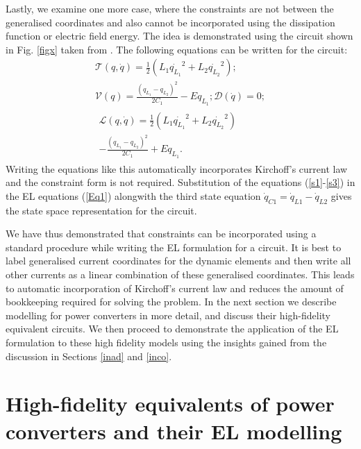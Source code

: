 \documentclass[preprint,12pt]{elsarticle}
\begin{document}
Lastly, we examine one more case, where the constraints are not between the generalised coordinates and also cannot be incorporated using the dissipation function or electric field energy.  
The idea is demonstrated using the circuit shown in Fig. \ref{figx} taken from \cite{scherpen_2003}. The following equations can be written for the circuit:
\begin{eqnarray}\label{s1}
\mathcal{T}(q,\dot{q}) = \frac{1}{2}(L_1\dot{q_{L_1}}^2+L_2\dot{q_{L_2}}^2);\\\label{s2} \mathcal{V}(q) = \frac{(q_{L_1}-q_{L_2})^2}{2C_1}-Eq_{L_1}; \mathcal{D}(\dot{q})=0; \\
\label{s3} \begin{split}
\mathcal{L}(q,\dot{q})=\frac{1}{2}(L_1\dot{q_{L_1}}^2+L_2\dot{q_{L_2}}^2)\\-\frac{(q_{L_1}-q_{L_2})^2}{2C_1}+Eq_{L_1}.
\end{split}
\end{eqnarray}
Writing the equations like this automatically incorporates Kirchoff's current law and the constraint form is not required. Substitution of the equations (\ref{s1}-\ref{s3}) in the EL equations (\ref{Eq1}) alongwith the third state equation $\dot{q}_{C1}=\dot{q}_{L1}-\dot{q}_{L2}$ gives the state space representation for the circuit.

We have thus demonstrated that constraints can be incorporated using a standard procedure while writing the EL formulation for a circuit. It is best to label generalised current coordinates for the dynamic elements and then write all other currents as a linear combination of these generalised coordinates. This leads to automatic incorporation of Kirchoff's current law and reduces the amount of bookkeeping required for solving the problem. In the next section we describe modelling for power converters in more detail, and discuss their high-fidelity equivalent circuits. We then proceed to demonstrate the application of the EL formulation to these high fidelity models using the insights gained from the discussion in Sections \ref{inad} and \ref{inco}.
\section{High-fidelity equivalents of power converters and their EL modelling}
\end{document}
